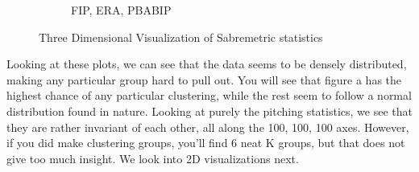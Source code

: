 \documentclass[12pt]{article}
\numberwithin{equation}{subsection}
\begin{document}
\begin{figure}[H]
\begin{subfigure}[b]{0.33\linewidth}
    \caption{FIP, ERA, PBABIP} 
    \label{fig5:f} 
  \end{subfigure} 
  \caption{Three Dimensional Visualization of Sabremetric statistics}
  \label{fig5}
\end{figure}

Looking at these plots, we can see that the data seems to be densely distributed, making any particular group hard to pull out. You will see that figure a has the highest chance of any particular clustering, while the rest seem to follow a normal distribution found in nature. Looking at purely the pitching statistics, we see that they are rather invariant of each other, all along the 100, 100, 100 axes. However, if you did make clustering groups, you'll find 6 neat K groups, but that does not give too much insight. We look into 2D visualizations next.
\end{document}
